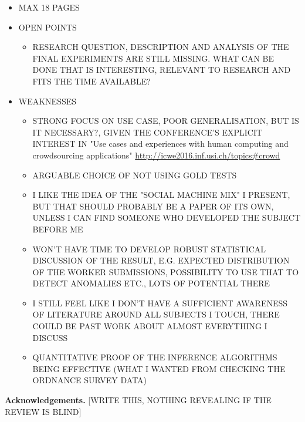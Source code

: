 \documentclass{llncs}
\begin{document}
\begin{itemize}
    \item MAX 18 PAGES
    \item OPEN POINTS
        \begin{itemize}
            \item RESEARCH QUESTION, DESCRIPTION AND ANALYSIS OF THE FINAL EXPERIMENTS ARE STILL MISSING. WHAT CAN BE DONE THAT IS INTERESTING, RELEVANT TO RESEARCH AND FITS THE TIME AVAILABLE?
        \end{itemize}
    \item WEAKNESSES 
        \begin{itemize}
            \item STRONG FOCUS ON USE CASE, POOR GENERALISATION, BUT IS IT NECESSARY?, GIVEN THE CONFERENCE'S EXPLICIT INTEREST IN "Use cases and experiences with human computing and crowdsourcing applications" \url{http://icwe2016.inf.usi.ch/topics#crowd}
            \item ARGUABLE CHOICE OF NOT USING GOLD TESTS
            \item I LIKE THE IDEA OF THE "SOCIAL MACHINE MIX" I PRESENT, BUT THAT SHOULD PROBABLY BE A PAPER OF ITS OWN, UNLESS I CAN FIND SOMEONE WHO DEVELOPED THE SUBJECT BEFORE ME
            \item WON'T HAVE TIME TO DEVELOP ROBUST STATISTICAL DISCUSSION OF THE RESULT, E.G. EXPECTED DISTRIBUTION OF THE WORKER SUBMISSIONS, POSSIBILITY TO USE THAT TO DETECT ANOMALIES ETC., LOTS OF POTENTIAL THERE
            \item I STILL FEEL LIKE I DON'T HAVE A SUFFICIENT AWARENESS OF LITERATURE AROUND ALL SUBJECTS I TOUCH, THERE COULD BE PAST WORK ABOUT ALMOST EVERYTHING I DISCUSS
            \item QUANTITATIVE PROOF OF THE INFERENCE ALGORITHMS BEING EFFECTIVE (WHAT I WANTED FROM CHECKING THE ORDNANCE SURVEY DATA)
        \end{itemize}
\end{itemize}









\textbf{Acknowledgements.} [WRITE THIS, NOTHING REVEALING IF THE REVIEW IS BLIND]


\end{document}
